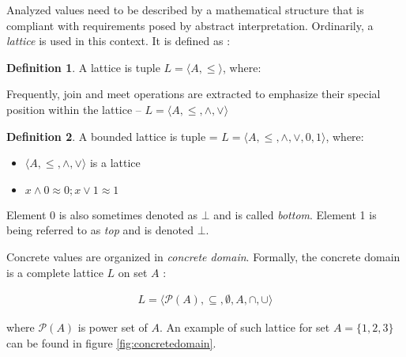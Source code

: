\documentclass[12pt,final,oneside]{fithesis2}
\theoremstyle{definition}
\newtheorem{definition}{Definition}
\begin{document}
Analyzed values need to be described by a mathematical structure that is compliant with
requirements posed by abstract interpretation. Ordinarily, a \textit{lattice} is used in this
context. It is defined as \cite{Burris81-1}:

\begin{definition}
A lattice is tuple $L = \langle A, \leq \rangle$, where:


\end{definition}

Frequently, join and meet operations are extracted to emphasize their special position
within the lattice -- $L = \langle A, \leq, \land, \lor \rangle$

\begin{definition}
A bounded lattice \cite{Burris81-1} is tuple = $L = \langle A, \leq, \land, \lor, 0, 1 \rangle$, where:

\begin{itemize}
\item $\langle A, \leq, \land, \lor \rangle$ is a lattice
\item $x  ; x  $
\end{itemize}

Element 0 is also sometimes denoted as $\bot$ and is called \textit{bottom}. Element 1 is
being referred to as \textit{top} and is denoted $\bot$.
\end{definition}

Concrete values are organized in \textit{concrete domain}. Formally,
the concrete domain is a complete lattice $L$ on set $A$ \cite{Constantini11-1}:

\begin{align*}
L = \langle \mathcal{P} (A), \subseteq, \emptyset, A, \cap, \cup \rangle
\end{align*}

where $ (A)$ is power set of $A$. An example of such lattice
for set $A = \{ 1, 2, 3 \}$ can be found in figure \ref{fig:concretedomain}.
\end{document}
